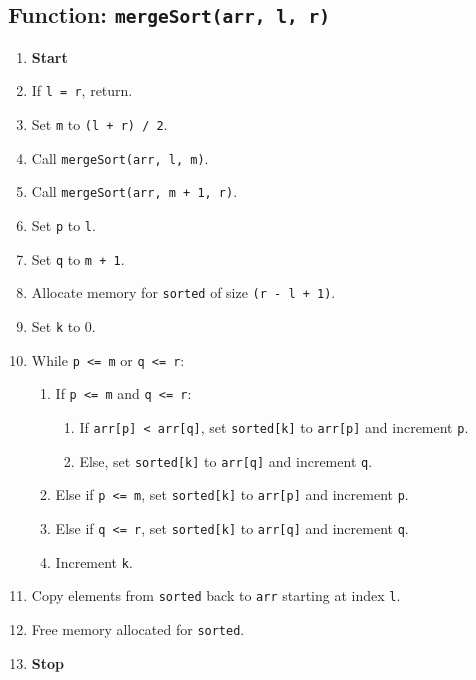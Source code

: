 {  \subsection{Function: \texttt{mergeSort(arr, l, r)}}
  \begin{enumerate}[label*=\arabic*.]
    \item \textbf{Start}
    \item If \texttt{l = r}, return.
    \item Set \texttt{m} to \texttt{(l + r) / 2}.
    \item Call \texttt{mergeSort(arr, l, m)}.
    \item Call \texttt{mergeSort(arr, m + 1, r)}.
    \item Set \texttt{p} to \texttt{l}.
    \item Set \texttt{q} to \texttt{m + 1}.
    \item Allocate memory for \texttt{sorted} of size \texttt{(r - l + 1)}.
    \item Set \texttt{k} to 0.
    \item While \texttt{p <= m} or \texttt{q <= r}:
          \begin{enumerate}[label*=\arabic*.]
            \item If \texttt{p <= m} and \texttt{q <= r}:
                  \begin{enumerate}[label*=\arabic*.]
                    \item If \texttt{arr[p] < arr[q]}, set \texttt{sorted[k]} to \texttt{arr[p]} and increment \texttt{p}.
                    \item Else, set \texttt{sorted[k]} to \texttt{arr[q]} and increment \texttt{q}.
                  \end{enumerate}
            \item Else if \texttt{p <= m}, set \texttt{sorted[k]} to \texttt{arr[p]} and increment \texttt{p}.
            \item Else if \texttt{q <= r}, set \texttt{sorted[k]} to \texttt{arr[q]} and increment \texttt{q}.
            \item Increment \texttt{k}.
          \end{enumerate}
    \item Copy elements from \texttt{sorted} back to \texttt{arr} starting at index \texttt{l}.
    \item Free memory allocated for \texttt{sorted}.
    \item \textbf{Stop}
  \end{enumerate}

}
